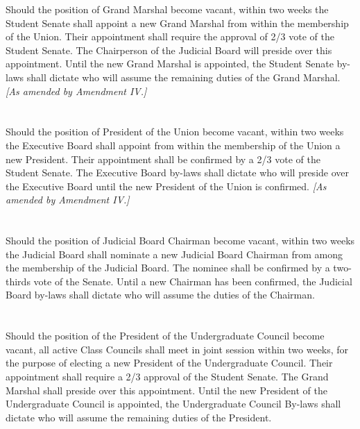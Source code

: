 \documentclass{uniondoc}
\begin{document}
Should the position of Grand Marshal become vacant, within two weeks the Student Senate shall appoint a new Grand Marshal from within the membership of the Union. Their appointment shall require the approval of 2/3 vote of the Student Senate. The Chairperson of the Judicial Board will preside over this appointment. Until the new Grand Marshal is appointed, the Student Senate by-laws shall dictate who will assume the remaining duties of the Grand Marshal. \textit{[As amended by Amendment IV.]}

\section{}

Should the position of President of the Union become vacant, within two weeks the Executive Board shall appoint from within the membership of the Union a new President. Their appointment shall be confirmed by a 2/3 vote of the Student Senate. The Executive Board by-laws shall dictate who will preside over the Executive Board until the new President of the Union is confirmed. \textit{[As amended by Amendment IV.]}

\section{}

Should the position of Judicial Board Chairman become vacant, within two weeks the Judicial Board shall nominate a new Judicial Board Chairman from among the membership of the Judicial Board. The nominee shall be confirmed by a two-thirds vote of the Senate. Until a new Chairman has been confirmed, the Judicial Board by-laws shall dictate who will assume the duties of the Chairman.

\section{}

Should the position of the President of the Undergraduate Council become vacant, all active Class Councils shall meet in joint session within two weeks, for the purpose of electing a new President of the Undergraduate Council. Their appointment shall require a 2/3 approval of the Student Senate. The Grand Marshal shall preside over this appointment. Until the new President of the Undergraduate Council is appointed, the Undergraduate Council By-laws shall dictate who will assume the remaining duties of the President.
\end{document}
